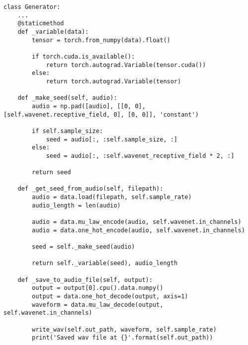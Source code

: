 \begin{verbatim}
class Generator:
    ...
    @staticmethod
    def _variable(data):
        tensor = torch.from_numpy(data).float()

        if torch.cuda.is_available():
            return torch.autograd.Variable(tensor.cuda())
        else:
            return torch.autograd.Variable(tensor)

    def _make_seed(self, audio):
        audio = np.pad([audio], [[0, 0], [self.wavenet.receptive_field, 0], [0, 0]], 'constant')

        if self.sample_size:
            seed = audio[:, :self.sample_size, :]
        else:
            seed = audio[:, :self.wavenet_receptive_field * 2, :]

        return seed

    def _get_seed_from_audio(self, filepath):
        audio = data.load(filepath, self.sample_rate)
        audio_length = len(audio)

        audio = data.mu_law_encode(audio, self.wavenet.in_channels)
        audio = data.one_hot_encode(audio, self.wavenet.in_channels)

        seed = self._make_seed(audio)

        return self._variable(seed), audio_length

    def _save_to_audio_file(self, output):
        output = output[0].cpu().data.numpy()
        output = data.one_hot_decode(output, axis=1)
        waveform = data.mu_law_decode(output, self.wavenet.in_channels)

        write_wav(self.out_path, waveform, self.sample_rate)
        print('Saved wav file at {}'.format(self.out_path))
\end{verbatim}